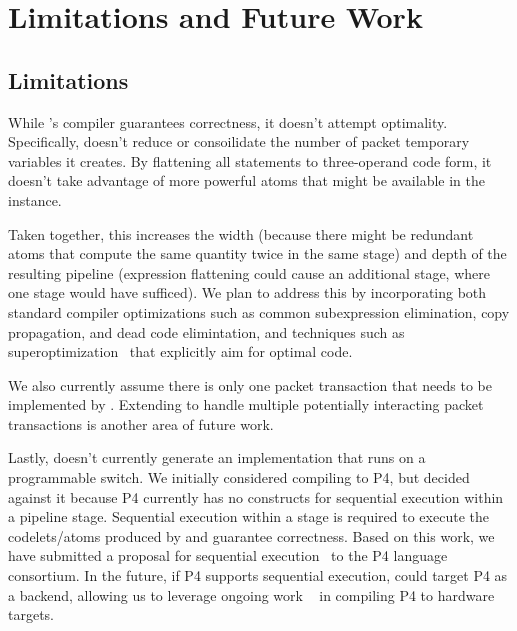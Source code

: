 \section{Limitations and Future Work}
\label{s:limitations}

\subsection{Limitations}
While \pktlanguage's compiler guarantees correctness, it doesn't attempt
optimality.  Specifically, \pktlanguage doesn't reduce or consoilidate the
number of packet temporary variables it creates. By flattening all statements
to three-operand code form, it doesn't take advantage of more powerful atoms
that might be available in the \absmachine instance.

Taken together, this increases the width (because there might be redundant
atoms that compute the same quantity twice in the same stage) and depth of the
resulting pipeline (expression flattening could cause an additional stage,
where one stage would have sufficed). We plan to address this by incorporating
both standard compiler optimizations such as common subexpression elimination,
copy propagation, and dead code elimintation, and techniques such as
superoptimization~\cite{stoke, superoptimizer} that explicitly aim for optimal
code.

We also currently assume there is only one packet transaction that needs to be
implemented by \pktlanguage. Extending \pktlanguage to handle multiple
potentially interacting packet transactions is another area of future work.

Lastly, \pktlanguage doesn't currently generate an implementation that runs on
a programmable switch. We initially considered compiling \pktlanguage to
P4, but decided against it because P4 currently has no constructs for
sequential execution within a pipeline stage. Sequential execution within a
stage is required to execute the codelets/atoms produced by \pktlanguage and
guarantee correctness. Based on this work, we have submitted a proposal for
sequential execution~\cite{p4-semantics} to the P4 language consortium. In the
future, if P4 supports sequential execution, \pktlanguage could target P4 as a
backend, allowing us to leverage ongoing work ~\cite{netronome,
xilinx,lavanya_compiler} in compiling P4 to hardware targets.

